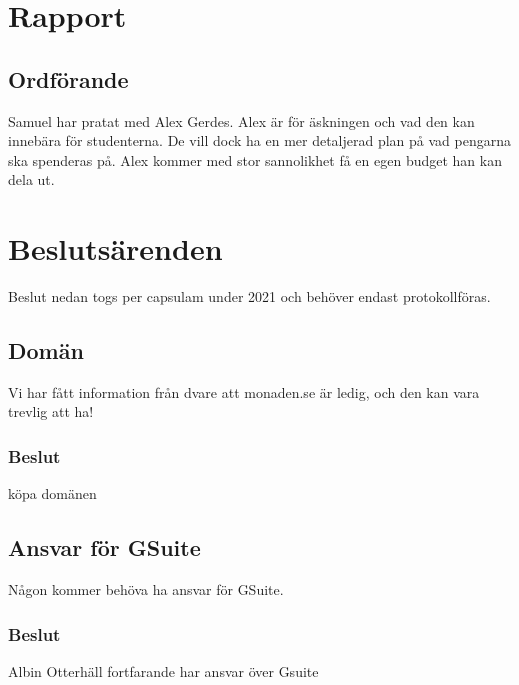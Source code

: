 \documentclass[protokoll]{dvd}
\begin{document}
\newpage

\newpage

\section{Rapport}
   \subsection*{Ordförande} 
   Samuel har pratat med Alex Gerdes. Alex är för äskningen och vad den kan innebära för studenterna.
   De vill dock ha en mer detaljerad plan på vad pengarna ska spenderas på.
   Alex kommer med stor sannolikhet få en egen budget han kan dela ut.

\newpage

\newpage

\section{Beslutsärenden}
    Beslut nedan togs per capsulam under 2021 och behöver endast protokollföras.

    \subsection{Domän}
        Vi har fått information från dvare att monaden.se är ledig, och den kan vara
        trevlig att ha!

        \subsubsection{Beslut}
        \begin{attsatser}
            \item köpa domänen
        \end{attsatser}

    \subsection{Ansvar för GSuite}
        Någon kommer behöva ha ansvar för GSuite.

        \subsubsection{Beslut}
        \begin{attsatser}
            \item Albin Otterhäll fortfarande har ansvar över Gsuite
        \end{attsatser}
\end{document}

